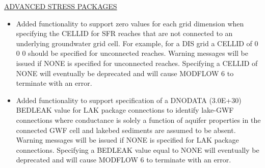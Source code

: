 	\underline{ADVANCED STRESS PACKAGES}
	\begin{itemize}
		\item Added functionality to support zero values for each grid dimension when specifying the CELLID for SFR reaches that are not connected to an underlying groundwater grid cell. For example, for a DIS grid a CELLID of 0 0 0 should be specified for unconnected reaches. Warning messages will be issued if NONE is specified for unconnected reaches. Specifying a CELLID of NONE will eventually be deprecated and will cause MODFLOW 6 to terminate with an error.
	\item Added functionality to support specification of a DNODATA (3.0E+30) BEDLEAK value for LAK package connections to identify lake-GWF connections where conductance is solely a function of aquifer properties in the connected GWF cell and lakebed sediments are assumed to be absent. Warning messages will be issued if NONE is specified for LAK package connections. Specifying a BEDLEAK value equal to NONE will eventually be deprecated and will cause MODFLOW 6 to terminate with an error.
	\end{itemize}


